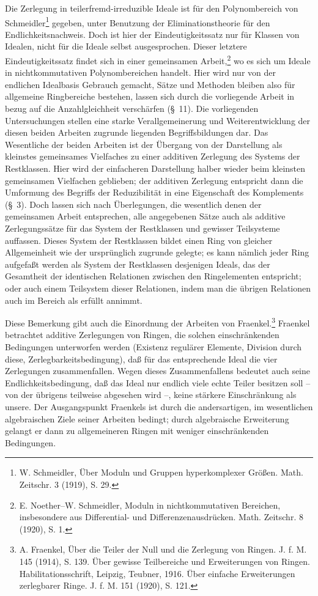 \documentclass[11pt]{article}
\begin{document}
Die Zerlegung in teilerfremd-irreduzible Ideale ist für den Polynombereich von Schmeidler\footnote{W. Schmeidler, Über Moduln und Gruppen hyperkomplexer Größen. Math. Zeitschr. 3 (1919), S. 29.} gegeben, unter Benutzung der Eliminationstheorie für den Endlichkeitsnachweis. Doch ist hier der Eindeutigkeitssatz nur für Klassen von Idealen, nicht für die Ideale selbst ausgesprochen. Dieser letztere Eindeutigkeitssatz findet sich in einer gemeinsamen Arbeit,\footnote{E. Noether--W. Schmeidler, Moduln in nichtkommutativen Bereichen, insbesondere aus Differential- und Differenzenausdrücken. Math. Zeitschr. 8 (1920), S. 1.} wo es sich um Ideale in nichtkommutativen Polynombereichen handelt. Hier wird nur von der endlichen Idealbasis Gebrauch gemacht, Sätze und Methoden bleiben also für allgemeine Ringbereiche bestehen, lassen sich durch die vorliegende Arbeit in bezug auf die Anzahlgleichheit verschärfen (\S~11). Die vorliegenden Untersuchungen stellen eine starke Verallgemeinerung und Weiterentwicklung der diesen beiden Arbeiten zugrunde liegenden Begriffsbildungen dar. Das Wesentliche der beiden Arbeiten ist der Übergang von der Darstellung als kleinstes gemeinsames Vielfaches zu einer additiven Zerlegung des Systems der Restklassen. Hier wird der einfacheren Darstellung halber wieder beim kleinsten gemeinsamen Vielfachen geblieben; der additiven Zerlegung entspricht dann die Umformung des Begriffs der Reduzibilität in eine Eigenschaft des Komplements (\S~3). Doch lassen sich nach Überlegungen, die wesentlich denen der gemeinsamen Arbeit entsprechen, alle angegebenen Sätze auch als additive Zerlegungssätze für das System der Restklassen und gewisser Teilsysteme auffassen. Dieses System der Restklassen bildet einen Ring von gleicher Allgemeinheit wie der ursprünglich zugrunde gelegte; es kann nämlich jeder Ring aufgefaßt werden als System der Restklassen desjenigen Ideals, das der Gesamtheit der identischen Relationen zwischen den Ringelementen entspricht; oder auch einem Teilsystem dieser Relationen, indem man die übrigen Relationen auch im Bereich als erfüllt annimmt.

Diese Bemerkung gibt auch die Einordnung der Arbeiten von Fraenkel.\footnote{A. Fraenkel, Über die Teiler der Null und die Zerlegung von Ringen. J. f. M. 145 (1914), S. 139. Über gewisse Teilbereiche und Erweiterungen von Ringen. Habilitationsschrift, Leipzig, Teubner, 1916. Über einfache Erweiterungen zerlegbarer Ringe. J. f. M. 151 (1920), S. 121.} Fraenkel betrachtet additive Zerlegungen von Ringen, die solchen einschränkenden Bedingungen unterworfen werden (Existenz regulärer Elemente, Division durch diese, Zerlegbarkeitsbedingung), daß für das entsprechende Ideal die vier Zerlegungen zusammenfallen. Wegen dieses Zusammenfallens bedeutet auch seine Endlichkeitsbedingung, daß das Ideal nur endlich viele echte Teiler besitzen soll -- von der übrigens teilweise abgesehen wird --, keine stärkere Einschränkung als unsere. Der Ausgangspunkt Fraenkels ist durch die andersartigen, im wesentlichen algebraischen Ziele seiner Arbeiten bedingt; durch algebraische Erweiterung gelangt er dann zu allgemeineren Ringen mit weniger einschränkenden Bedingungen.
\end{document}
